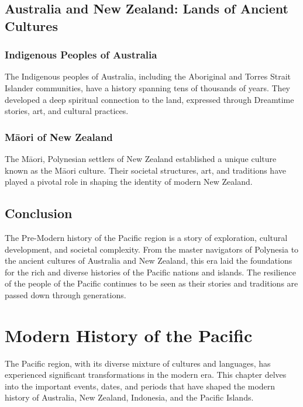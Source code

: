 \documentclass{book}
\begin{document}
\section{Australia and New Zealand: Lands of Ancient Cultures}
\label{sec:australia-new-zealand}

\subsection{Indigenous Peoples of Australia}
\label{subsec:australia-indigenous-peoples}

The Indigenous peoples of Australia, including the Aboriginal and Torres Strait Islander communities, have a history spanning tens of thousands of years. They developed a deep spiritual connection to the land, expressed through Dreamtime stories, art, and cultural practices.

\subsection{Māori of New Zealand}
\label{subsec:maori-new-zealand}

The Māori, Polynesian settlers of New Zealand established a unique culture known as the Māori culture. Their societal structures, art, and traditions have played a pivotal role in shaping the identity of modern New Zealand.

\section{Conclusion}
\label{sec:conclusion-pre-modern-pacific}

The Pre-Modern history of the Pacific region is a story of exploration, cultural development, and societal complexity. From the master navigators of Polynesia to the ancient cultures of Australia and New Zealand, this era laid the foundations for the rich and diverse histories of the Pacific nations and islands. The resilience of the people of the Pacific continues to be seen as their stories and traditions are passed down through generations.

\chapter{Modern History of the Pacific}
\label{ch:modern-pacific-history}

The Pacific region, with its diverse mixture of cultures and languages, has experienced significant transformations in the modern era. This chapter delves into the important events, dates, and periods that have shaped the modern history of Australia, New Zealand, Indonesia, and the Pacific Islands.
\end{document}
